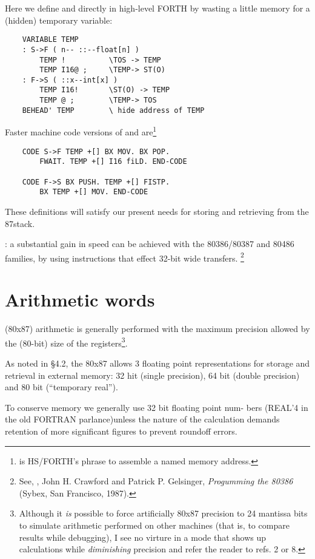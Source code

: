Here we define  and  directly in high-level FORTH by wasting a little memory for a (hidden) temporary variable:

\begin{lstlisting}
    VARIABLE TEMP
    : S->F ( n-- ::--float[n] )
        TEMP !          \TOS -> TEMP
        TEMP I16@ ;     \TEMP-> ST(O)
    : F->S ( ::x--int[x] )
        TEMP I16!       \ST(O) -> TEMP
        TEMP @ ;        \TEMP-> TOS
    BEHEAD' TEMP        \ hide address of TEMP
\end{lstlisting}

Faster machine code versions of  and  are\footnote{ is HS/FORTH's phrase to assemble a named memory address.}

\begin{lstlisting}
    CODE S->F TEMP +[] BX MOV. BX POP.
        FWAIT. TEMP +[] I16 fiLD. END-CODE

    CODE F->S BX PUSH. TEMP +[] FISTP.
        BX TEMP +[] MOV. END-CODE
\end{lstlisting}

These definitions will satisfy our present needs for storing and retrieving from the 87stack.

\leftbar[1\linewidth]
\Note: a substantial gain in speed can be achieved with the
80386/80387 and 80486 families, by using instructions that effect
32-bit wide transfers.
\endleftbar \footnote{See, \eg, John H. Crawford and Patrick P. Gelsinger, \textit{Progumming the 80386} (Sybex, San Francisco, 1987).}

\section{Arithmetic words}

 (80x87) arithmetic is generally performed with the maximum precision allowed by the (80-bit) size of the registers\footnote{Although it \textit{is} possible to force artificially 80x87 precision to 24 mantissa bits to simulate arithmetic performed on other machines (that is, to compare results while debugging), I see no virture in a mode that shows up calculations while \textit{diminishing} precision and refer the reader to refs. 2 or 8.}.

As noted in §4.2, the 80x87 allows 3 floating point representations
for storage and retrieval in external memory: 32 hit (single precision),
64 bit (double precision) and 80 bit (“temporary real”).

To conserve memory we generally use 32 bit floating point num-
bers (REAL'4 in the old FORTRAN parlance)unless the nature
of the calculation demands retention of more significant figures
to prevent roundoff errors.

